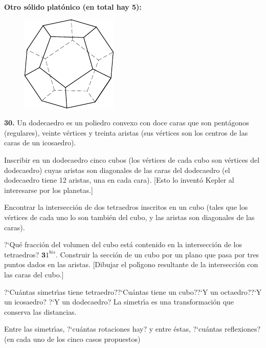 \documentclass[12pt]{article}  %
\begin{document}
\newpage
\noindent
{\bf Otro s\'olido plat\'onico (en total hay 5):}
\begin{figure}[h]
\centering
\includegraphics{taskbook-14}\\[2pt]
\end{figure}

\noindent
{\bf 30.} Un dodecaedro es un poliedro convexo con doce caras que son pent\'agonos (regulares), veinte v\'ertices y treinta aristas
 (sus v\'ertices son los centros de las caras de un icosaedro).

Inscribir en un dodecaedro cinco cubos (los v\'ertices de cada cubo son v\'ertices del dodecaedro)
cuyas aristas son diagonales de las caras del dodecaedro (el dodecaedro tiene 12 aristas, una en cada cara).
[Esto lo invent\'o Kepler al interesarse por los planetas.] 

\bigskip
{} Encontrar la intersecci\'on de dos tetraedros inscritos en un cubo (tales que los v\'ertices de cada uno lo son tambi\'en del cubo, y las aristas son diagonales de las caras). 

?`Qu\'e fracci\'on del volumen del cubo est\'a contenido en la intersecci\'on de los tetraedros?
\newline\newline\quad
$\mathbf 31^{bis}.$ Construir la secci\'on de un cubo por un plano que pasa por tres puntos dados en las aristas.
[Dibujar el pol\'{\i}gono resultante de la intersecci\'on con las caras del cubo.]
\begin{figure}[h]
\centering
\end{figure}

 ?`Cu\'antas simetr\'{\i}as tiene tetraedro??`Cu\'antas tiene un cubo??`Y un octaedro??`Y un icosaedro? ?`Y un dodecaedro? La simetr\'{\i}a es una transformaci\'on que conserva las distancias.

Entre las simetr\'{\i}as, ?`cu\'antas rotaciones hay? y entre \'estas, ?`cu\'antas reflexiones? (en cada uno de los cinco casos propuestos)
\end{document}
